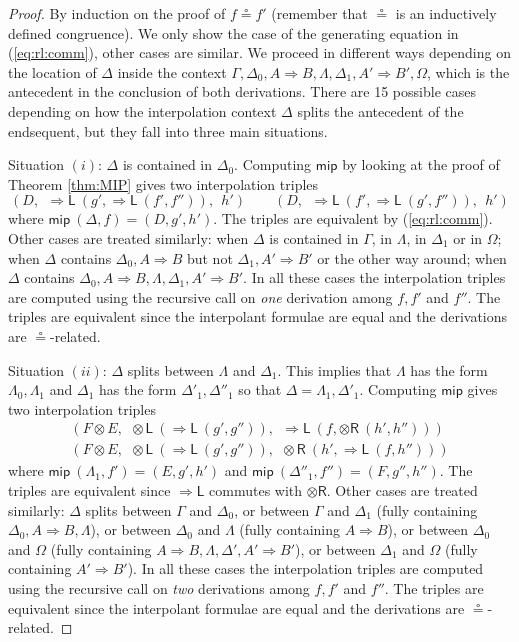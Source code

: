 \documentclass[a4paper,UKenglish,cleveref,autoref,thm-restate, anonymous]{lipics-v2021}
\newcommand{\ot}{\otimes}
\newcommand{\Rarr}{\Rightarrow}
\newcommand{\mf}[1]{\mathsf{#1}}
\newcommand{\GG}{\Gamma}
\newcommand{\GD}{\Delta}
\newcommand{\GL}{\Lambda}
\newcommand{\GO}{\Omega}
\newcommand{\tl}{{\otimes}\mathsf{L}}
\newcommand{\tr}{{\otimes}\mathsf{R}}
\newcommand{\Rl}{{\Rarr}\mathsf{L}}
\begin{document}
\begin{proof}
  By induction on the proof of $f \circeq f'$ (remember that $\circeq$ is an inductively defined congruence).
  We only show the case of the generating equation in (\ref{eq:rl:comm}), other cases are similar.
  We proceed in different ways depending on the location of $\GD$ inside the context $\GG , \GD_0 , A \Rarr B , \GL , \GD_1 , A' \Rarr B', \GO$, which is the antecedent in the conclusion of both derivations.
  There are 15 possible cases depending on how the interpolation context $\GD$ splits the antecedent of the endsequent, but they fall into three main situations.

Situation $(i)$: $\GD$ is contained in $\GD_0$. Computing $\mf{mip}$ by looking at the proof of Theorem \ref{thm:MIP} gives two interpolation triples
$$(D , \ \ \Rl \ (g',\Rl\ (f' , f'')) , \ \ h') \qquad (D , \ \ \Rl \ (f' , \Rl \ (g' , f'')) , \ \ h')$$
where $\mf{mip} \ (\GD,f) = (D,g',h')$.
The triples are equivalent by (\ref{eq:rl:comm}).
Other cases are treated similarly: when $\GD$ is contained in $\GG$, in $\Lambda$, in $\GD_1$ or in $\GO$; when $\GD$ contains $\GD_0 , A\Rarr B$ but not $\GD_1 , A' \Rarr B'$ or the other way around; when $\GD$ contains $\GD_0 , A \Rarr B , \GL , \GD_1 , A' \Rarr B'$.
In all these cases the interpolation triples are computed using the recursive call on \emph{one} derivation among $f,f'$ and $f''$.
The triples are equivalent since the interpolant formulae are equal and the derivations are $\circeq$-related.


Situation $(ii)$: $\GD$ splits between $\GL$ and $\GD_1$. This implies that $\GL$ has the form $\GL_0 , \GL_1$ and $\GD_1$ has the form $\GD'_{1} , \GD''_{1}$ so that $\GD = \GL_1 , \GD'_1$. Computing $\mf{mip}$ gives two interpolation triples
\[
\begin{array}{l}
  (F \ot E ,\ \ \tl \ (\Rl \ (g' , g'')) , \ \ \Rl \ (f , \tr\ (h' 
  , h'')))
  \\[3pt]
  (F \ot E , \ \ \tl \ (\Rl \ (g' , g'')) , \ \ \tr \ (h' , \Rl \ (f , h'')))
\end{array}
\]
where $\mf{mip} \ (\GL_1 , f') = (E , g' , h')$ and $\mf{mip} \ (\GD''_{1} , f'') = (F , g'' , h'')$.
The triples are equivalent since $\Rl$ commutes with $\tr$.
Other cases are treated similarly: $\GD$ splits between $\GG$ and $\GD_0$, or between $\GG$ and $\GD_1$ (fully containing $\GD_0,A \Rarr B,\GL$), or between $\GD_0$ and $\GL$ (fully containing $A \Rarr B$), or between $\GD_0$ and $\GO$ (fully containing $A \Rarr B,\GL,\GD',A' \Rarr B'$), or between $\GD_1$ and $\GO$ (fully containing $A' \Rarr B'$).
In all these cases the interpolation triples are computed using the recursive call on \emph{two} derivations among $f,f'$ and $f''$.
The triples are equivalent since the interpolant formulae are equal and the derivations are $\circeq$-related.



\end{proof}
\end{document}
